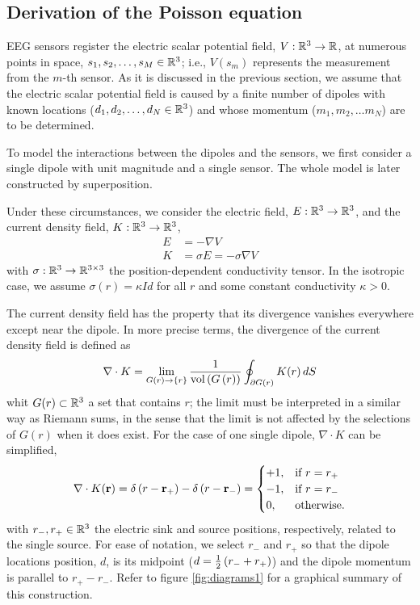 
\subsection{Derivation of the Poisson equation}

EEG sensors register the electric scalar potential field, $V: \mathbb{R}^3 \rightarrow \mathbb{R}$, at numerous points in space, $s_{1}, s_2, \dots, s_M \in \mathbb{R}^3$; i.e., $V(s_m)$ represents the measurement from the $m$-th sensor.
%
As it is discussed in the previous section, we assume that the electric scalar potential field is caused by a finite number of dipoles with known locations ($d_1, d_2, \dots, d_N \in \mathbb{R}^3$) and whose momentum ($m_1, m_2, \dots m_N$) are to be determined.

To model the interactions between the dipoles and the sensors, we first consider a single dipole with unit magnitude and a single sensor. The whole model is later constructed by superposition.

Under these circumstances, we consider the electric field, $E: \mathbb{R}^3 \rightarrow \mathbb{R}^3$, and the current density field, $K: \mathbb{R}^3 \rightarrow \mathbb{R}^3$,
\begin{align}
E &= - \nabla V
\\
K &= \sigma E = - \sigma \nabla V
\label{eq:model1}
\end{align}
with $\sigma: \mathbb{R}^3 \rightarrow \mathbb{R}^{3\times 3}$ the position-dependent conductivity tensor. 
%
In the isotropic case, we assume
$\sigma(r) = \kappa Id$
for all $r$ and some constant conductivity $\kappa>0$.

The current density field has the property that its divergence vanishes everywhere except near the dipole.
%
In more precise terms, the divergence of the current density field is defined as
\begin{equation}
\nabla \cdot K = \lim_{G(r) \rightarrow \left\{ r \right\}} \frac{1}{\text{vol}\left( G\left( r \right) \right)}
\oint_{\partial G(r)} K(r)\, dS
\end{equation}
whit $G(r)\subset \mathbb{R}^3$ a set that contains $r$; the limit must be interpreted in a similar way as Riemann sums, in the sense that the limit is not affected by the selections of $G(r)$ when it does exist.
%
For the case of one single dipole, $\nabla \cdot K$ can be simplified,
\begin{equation}
\nabla \cdot K(\mathbf{r}) = {\delta\left( r-\mathbf{r}_+ \right) - \delta\left( r-\mathbf{r}_- \right)} =
\begin{cases}
+1, &\text{if } r=r_+ \\
-1, &\text{if } r=r_- \\
0, &\text{otherwise}.
\end{cases}
\label{eq:model2}
\end{equation}
with $r_-, r_+ \in \mathbb{R}^3$ the electric sink and source positions, respectively, related to the single source. 
%
For ease of notation, we select $r_-$ and $r_+$ so that the dipole locations position, $d$, is its midpoint ($d= \frac{1}{2}\left( r_-+r_+ \right)$) and the dipole momentum is parallel to $r_+-r_-$.
%
Refer to figure \ref{fig:diagrams1} for a graphical summary of this construction.

